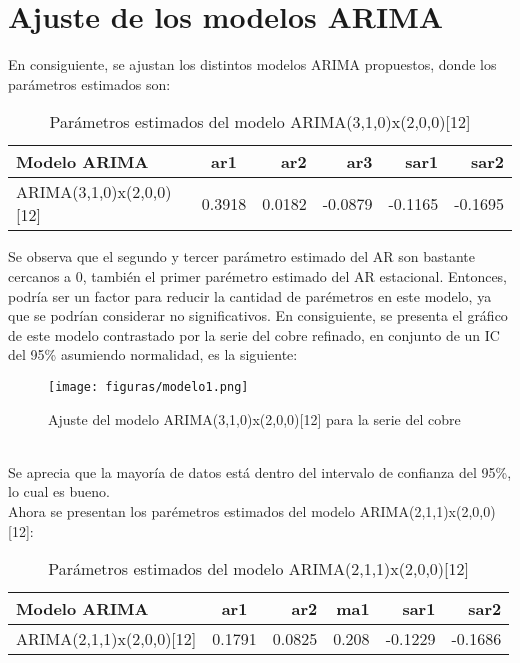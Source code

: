\documentclass{report}
\begin{document}
\newpage
\section{Ajuste de los modelos ARIMA}\label{Ajuste}
En consiguiente, se ajustan los distintos modelos ARIMA propuestos, donde los parámetros estimados son:\\

\begin{table}[h!]
  \begin{center}
    \label{tab:table1}
    \begin{tabular}{|l|c|r|r|r|r|} 
      \hline
      \textbf{Modelo ARIMA} & ar1 & ar2 & ar3 &sar1 &sar2\\
      \hline
      ARIMA(3,1,0)x(2,0,0)[12] & 0.3918 & 0.0182 
      &-0.0879 & -0.1165 & -0.1695 \\
      \hline
    \end{tabular}
  \end{center}
  \caption{Parámetros estimados del modelo ARIMA(3,1,0)x(2,0,0)[12]}
\end{table}

Se observa que el segundo y tercer parámetro estimado del AR son bastante cercanos a 0, también el primer parémetro estimado del AR estacional. Entonces, podría ser un factor para reducir la cantidad de parémetros en este modelo, ya que se podrían considerar no significativos. En consiguiente, se presenta el gráfico de este modelo contrastado por la serie del cobre refinado, en conjunto de un IC del 95\% asumiendo normalidad, es la siguiente:\\
\begin{figure}[htp]
        \centering
    	\texttt{[image: figuras/modelo1.png]}
    	\caption{Ajuste del modelo ARIMA(3,1,0)x(2,0,0)[12] para la serie del cobre}
    	\label{fig: Figura1}
    \end{figure}\\

Se aprecia que la mayoría de datos está dentro del intervalo de confianza del 95\%, lo cual es bueno. \\

Ahora se presentan los parémetros estimados del modelo ARIMA(2,1,1)x(2,0,0)[12]:\\
\vspace{3cm}

\begin{table}[h!]
  \begin{center}
    \label{tab:table1}
    \begin{tabular}{|l|c|r|r|r|r|} 
      \hline
      \textbf{Modelo ARIMA} & ar1 & ar2 & ma1 &sar1 &sar2\\
      \hline
      ARIMA(2,1,1)x(2,0,0)[12] & 0.1791 & 0.0825  & 0.208 &  -0.1229 & -0.1686 \\
      \hline
    \end{tabular}
  \end{center}
  \caption{Parámetros estimados del modelo ARIMA(2,1,1)x(2,0,0)[12]}
\end{table}\\
\end{document}
